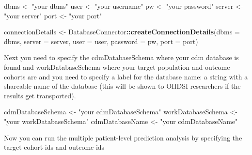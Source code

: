 \documentclass[
]{article}
\newenvironment{Shaded}{\begin{snugshade}}{\end{snugshade}}
\newcommand{\DataTypeTok}[1]{\textcolor[rgb]{0.13,0.29,0.53}{#1}}
\newcommand{\KeywordTok}[1]{\textcolor[rgb]{0.13,0.29,0.53}{\textbf{#1}}}
\newcommand{\NormalTok}[1]{#1}
\newcommand{\OperatorTok}[1]{\textcolor[rgb]{0.81,0.36,0.00}{\textbf{#1}}}
\newcommand{\StringTok}[1]{\textcolor[rgb]{0.31,0.60,0.02}{#1}}
\begin{document}
\begin{Shaded}
\begin{Highlighting}[]
\NormalTok{dbms <-}\StringTok{ "your dbms"}
\NormalTok{user <-}\StringTok{ "your username"}
\NormalTok{pw <-}\StringTok{ "your password"}
\NormalTok{server <-}\StringTok{ "your server"}
\NormalTok{port <-}\StringTok{ "your port"}

\NormalTok{connectionDetails <-}\StringTok{ }\NormalTok{DatabaseConnector}\OperatorTok{::}\KeywordTok{createConnectionDetails}\NormalTok{(}\DataTypeTok{dbms =}\NormalTok{ dbms,}
                                                                \DataTypeTok{server =}\NormalTok{ server,}
                                                                \DataTypeTok{user =}\NormalTok{ user,}
                                                                \DataTypeTok{password =}\NormalTok{ pw,}
                                                                \DataTypeTok{port =}\NormalTok{ port)}
\end{Highlighting}
\end{Shaded}

Next you need to specify the cdmDatabaseSchema where your cdm database
is found and workDatabaseSchema where your target population and outcome
cohorts are and you need to specify a label for the database name: a
string with a shareable name of the database (this will be shown to
OHDSI researchers if the results get transported).

\begin{Shaded}
\begin{Highlighting}[]
\NormalTok{cdmDatabaseSchema <-}\StringTok{ "your cdmDatabaseSchema"}
\NormalTok{workDatabaseSchema <-}\StringTok{ "your workDatabaseSchema"}
\NormalTok{cdmDatabaseName <-}\StringTok{ "your cdmDatabaseName"}
\end{Highlighting}
\end{Shaded}

Now you can run the multiple patient-level prediction analysis by
specifying the target cohort ids and outcome ids
\end{document}
